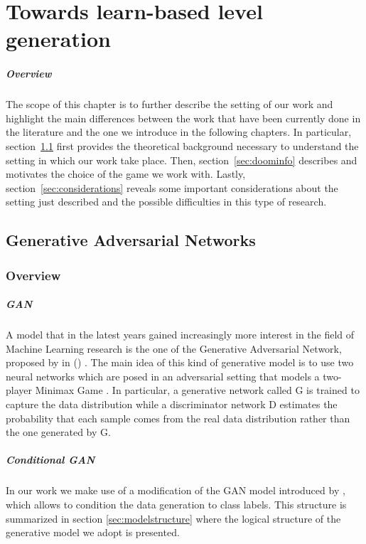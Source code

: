 \chapter{Towards learn-based level generation}
\paragraph{Overview} The scope of this chapter is to further describe the setting of our work and highlight the main differences between the work that have been currently done in the literature and the one we introduce in the following chapters. In particular, section~\ref{sec:gantheory} first provides the theoretical background necessary to understand the setting in which our work take place. Then, section~\ref{sec:doominfo} describes and motivates the choice of the game we work with. Lastly, section~\ref{sec:considerations} reveals some important considerations about the setting just described and the possible difficulties in this type of research.
\section{Generative Adversarial Networks}
\label{sec:gantheory}
\subsection{Overview}

\label{sec:introgan}
\paragraph{GAN} A model that in the latest years gained increasingly more interest in the field of Machine Learning research is the one of the Generative Adversarial Network, proposed by \citeauthor{gan} in  (\citeyear{gan}) \cite{gan}. The main idea of this kind of generative model is to use two neural networks which are posed in an adversarial setting that models a two-player Minimax Game \cite[p.~276]{minimax}. In particular, a generative network called G is trained to capture the data distribution while a discriminator network D estimates the probability that each sample comes from the real data distribution rather than the one generated by G.
\paragraph{Conditional GAN} In our work we make use of a modification of the GAN model introduced by \citeauthor{conditionalgan} \cite{conditionalgan}, which allows to condition the data generation to class labels. This structure is summarized in section \ref{sec:modelstructure} where the logical structure of the generative model we adopt is presented.

